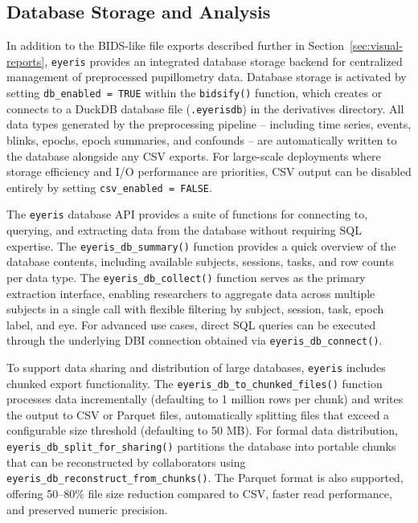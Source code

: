 \subsection{Database Storage and Analysis}
In addition to the BIDS-like file exports described further in Section~\ref{sec:visual-reports}, \texttt{eyeris} provides an integrated database storage backend for centralized management of preprocessed pupillometry data. Database storage is activated by setting \texttt{db\_enabled = TRUE} within the \texttt{bidsify()} function, which creates or connects to a DuckDB \parencite{raasveldt2019duckdb} database file (\texttt{.eyerisdb}) in the derivatives directory. All data types generated by the preprocessing pipeline – including time series, events, blinks, epochs, epoch summaries, and confounds – are automatically written to the database alongside any CSV exports. For large-scale deployments where storage efficiency and I/O performance are priorities, CSV output can be disabled entirely by setting \texttt{csv\_enabled = FALSE}.

The \texttt{eyeris} database API provides a suite of functions for connecting to, querying, and extracting data from the database without requiring SQL expertise. The \texttt{eyeris\_db\_summary()} function provides a quick overview of the database contents, including available subjects, sessions, tasks, and row counts per data type. The \texttt{eyeris\_db\_collect()} function serves as the primary extraction interface, enabling researchers to aggregate data across multiple subjects in a single call with flexible filtering by subject, session, task, epoch label, and eye. For advanced use cases, direct SQL queries can be executed through the underlying DBI connection obtained via \texttt{eyeris\_db\_connect()}.

To support data sharing and distribution of large databases, \texttt{eyeris} includes chunked export functionality. The \texttt{eyeris\_db\_to\_chunked\_files()} function processes data incrementally (defaulting to 1 million rows per chunk) and writes the output to CSV or Parquet files, automatically splitting files that exceed a configurable size threshold (defaulting to 50 MB). For formal data distribution, \texttt{eyeris\_db\_split\_for\_sharing()} partitions the database into portable chunks that can be reconstructed by collaborators using \texttt{eyeris\_db\_reconstruct\_from\_chunks()}. The Parquet format is also supported, offering 50–80\% file size reduction compared to CSV, faster read performance, and preserved numeric precision.

